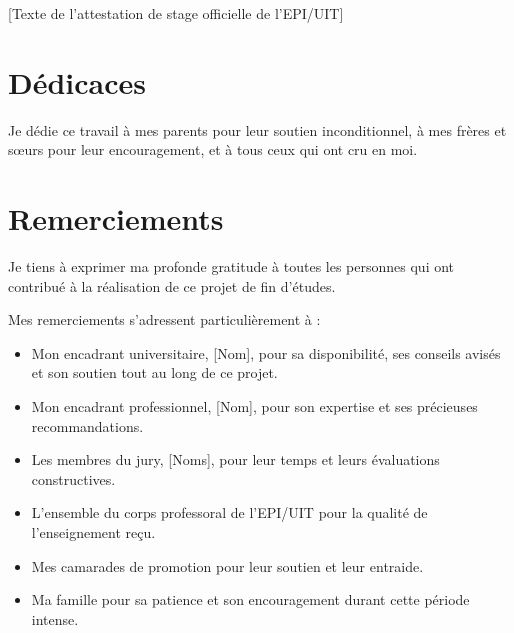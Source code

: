 \documentclass[12pt,a4paper]{report}
\begin{document}
[Texte de l'attestation de stage officielle de l'EPI/UIT]

\newpage
\thispagestyle{empty}
\chapter*{Dédicaces}

Je dédie ce travail à mes parents pour leur soutien inconditionnel, à mes frères et sœurs pour leur encouragement, et à tous ceux qui ont cru en moi.

\newpage
\chapter*{Remerciements}

Je tiens à exprimer ma profonde gratitude à toutes les personnes qui ont contribué à la réalisation de ce projet de fin d'études.

Mes remerciements s'adressent particulièrement à :
\begin{itemize}
    \item Mon encadrant universitaire, [Nom], pour sa disponibilité, ses conseils avisés et son soutien tout au long de ce projet.
    \item Mon encadrant professionnel, [Nom], pour son expertise et ses précieuses recommandations.
    \item Les membres du jury, [Noms], pour leur temps et leurs évaluations constructives.
    \item L'ensemble du corps professoral de l'EPI/UIT pour la qualité de l'enseignement reçu.
    \item Mes camarades de promotion pour leur soutien et leur entraide.
    \item Ma famille pour sa patience et son encouragement durant cette période intense.
\end{itemize}

\newpage
\tableofcontents
\thispagestyle{empty}
\newpage

\listoftables
{}
\newpage

\listoffigures
{}
\newpage

\end{document}
